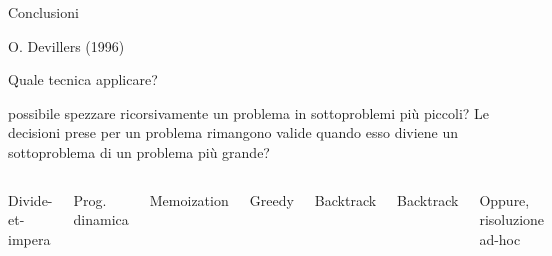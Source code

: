 \begin{frame}{Conclusioni}




O. Devillers (1996)

\end{frame}



\begin{frame}{Quale tecnica applicare?}

\vspace{-9pt}
\begin{myboxtitle}
\EE possibile spezzare ricorsivamente un problema in sottoproblemi più piccoli? Le decisioni prese per un problema rimangono valide quando esso diviene un sottoproblema di un problema più grande?
\end{myboxtitle}


\vspace{-9pt}
\begin{columns}[T]
\BIL
\item Divide-et-impera
\item Prog. dinamica
\item Memoization
\item Greedy
\item Backtrack
\EIL
{}
\BIL
\item Backtrack
\item Oppure, risoluzione ad-hoc
\EIL
\end{columns}

\end{frame}

